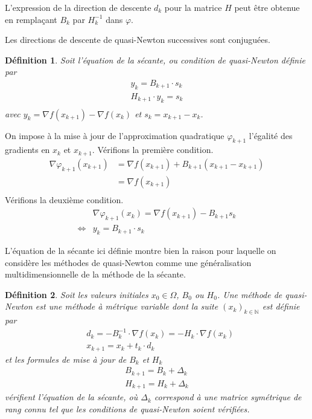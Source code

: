 \documentclass[3p, twocolumn]{elsarticle}
\newtheorem{definition}{Définition}[section]
\begin{document}
\begin{rmk}
    L'expression de la direction de descente $d_k$ pour la matrice $H$ peut être obtenue en remplaçant $B_k$ par $H_k^{-1}$ dans $\varphi$.
\end{rmk}
\begin{rmk}
    Les directions de descente de quasi-Newton successives sont conjuguées.
\end{rmk}

\begin{definition}
    Soit l'équation de la sécante, ou condition de quasi-Newton définie par 
    \begin{align}
        y_k = B_{k+1} \cdot s_k
        \label{eq:sec-qn-bk}\\
        H_{k+1} \cdot y_k = s_k
        \label{eq:sec-qn-hk}\\
    \end{align}
    avec $y_k = \nabla f(x_{k+1}) - \nabla f(x_k)$ et $s_k = x_{k+1} - x_k$.
\end{definition}
\begin{pf}
    On impose à la mise à jour de l'approximation quadratique $\varphi_{k+1}$ l'égalité des gradients en $x_k$ et $x_{k+1}$.
    Vérifions la première condition.
    \begin{align*}
        \nabla \varphi_{k+1}(x_{k+1}) &= \nabla f(x_{k+1}) + B_{k+1}(x_{k+1} - x_{k+1}) \\
        &= \nabla f(x_{k+1})\\
    \end{align*}
    Vérifions la deuxième condition.
    \begin{align*}
        &\nabla \varphi_{k+1}(x_{k}) = \nabla f(x_{k+1}) - B_{k+1}s_k \\
        \iff& y_k = B_{k+1}\cdot s_k
    \end{align*}
\end{pf}

\begin{rmk}
    L'équation de la sécante ici définie montre bien la raison pour laquelle on considère les méthodes de quasi-Newton comme une généralisation multidimensionnelle de la méthode de la sécante.
\end{rmk}
\begin{definition}
    Soit les valeurs initiales $x_0\in \Omega$, $B_0$ ou $H_0$. Une méthode de quasi-Newton est une méthode à métrique variable dont la suite $(x_k)_{k\in \mathbb{N}}$ est définie par
    \begin{align*}
        &d_k = -B_k^{-1}\cdot \nabla f(x_k) = -H_k\cdot \nabla f(x_k) \\
        &x_{k+1} = x_k + t_k\cdot d_k
    \end{align*}
    et les formules de mise à jour de $B_k$ et $H_k$
    \begin{align}
        B_{k+1} = B_k + \Delta_k
        \label{eq:maj-bk}\\
        H_{k+1} = H_k + \Delta_k
        \label{eq:maj-hk}
    \end{align}
    vérifient l'équation de la sécante, où $\Delta_k$ correspond à une matrice symétrique de rang connu tel que les conditions de quasi-Newton soient vérifiées.
\end{definition}
\end{document}
